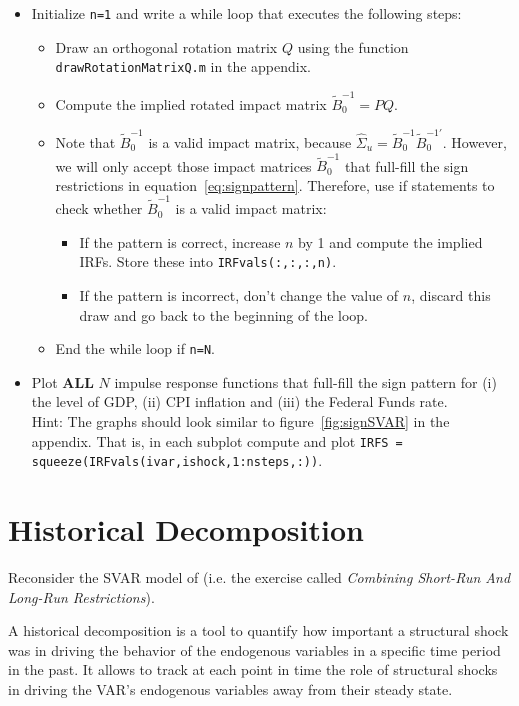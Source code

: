 \documentclass{article}
\begin{document}
\begin{enumerate}
\begin{itemize}
	\item Initialize \texttt{n=1} and write a while loop that executes the following steps:
		\begin{itemize}
		\item Draw an orthogonal rotation matrix \(Q\) using the function \texttt{drawRotationMatrixQ.m} in the appendix.
		\item Compute the implied rotated impact matrix \(\widetilde{B}_0^{-1}=PQ\).
		\item Note that \(\widetilde{B}_0^{-1}\) is a valid impact matrix, because \(\hat{\Sigma}_u = \widetilde{B}_0^{-1} \widetilde{B}_0^{-1'}\).
		However, we will only accept those impact matrices \(\widetilde{B}_0^{-1}\) that full-fill the sign restrictions in equation~\eqref{eq:signpattern}.
		Therefore, use if statements to check whether \(\widetilde{B}_0^{-1}\) is a valid impact matrix:
		\begin{itemize}
			\item If the pattern is correct, increase \(n\) by 1 and compute the implied IRFs. Store these into \texttt{IRFvals(:,:,:,n)}.
			\item If the pattern is incorrect, don't change the value of \(n\), discard this draw and go back to the beginning of the loop.
			\end{itemize}
		\item End the while loop if \texttt{n=N}.
		\end{itemize}
	\item Plot \textbf{ALL} \(N\) impulse response functions that full-fill the sign pattern for (i) the level of GDP, (ii) CPI inflation and (iii) the Federal Funds rate.
	\\Hint: The graphs should look similar to figure~\ref{fig:signSVAR} in the appendix.
	That is, in each subplot compute and plot \texttt{IRFS = squeeze(IRFvals(ivar,ishock,1:nsteps,:))}.
	\end{itemize}
\end{enumerate}

\newpage

\section[Historical Decomposition]{Historical Decomposition}
Reconsider the SVAR model of \textcite{Rubio-Ramirez.Waggoner.Zha_2010_StructuralVectorAutoregressions}
(i.e. the exercise called \emph{Combining Short-Run And Long-Run Restrictions}).

A historical decomposition is a tool to quantify how important a structural shock was
in driving the behavior of the endogenous variables in a specific time period in the past.
It allows to track at each point in time the role of structural shocks
in driving the VAR's endogenous variables away from their steady state.
\end{document}
